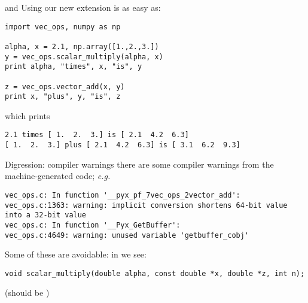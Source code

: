 \documentclass[10pt, t]{beamer}
\let\texttt=\graytt
\begin{document}
\begin{frame}[fragile,label=sec-4-6]{\texttt{cython} and \texttt{numpy}}
 Using our new extension is as easy as:
\lstset{language=Python,label= ,caption= ,numbers=none}
\begin{lstlisting}
import vec_ops, numpy as np

alpha, x = 2.1, np.array([1.,2.,3.])
y = vec_ops.scalar_multiply(alpha, x)
print alpha, "times", x, "is", y

z = vec_ops.vector_add(x, y)
print x, "plus", y, "is", z
\end{lstlisting}
\pause
which prints
\lstset{language=Python,label= ,caption= ,numbers=none}
\begin{lstlisting}
2.1 times [ 1.  2.  3.] is [ 2.1  4.2  6.3]
[ 1.  2.  3.] plus [ 2.1  4.2  6.3] is [ 3.1  6.2  9.3]
\end{lstlisting}
\end{frame}
\begin{frame}[fragile,label=sec-4-7]{Digression: compiler warnings}
 there are some compiler warnings from the machine-generated code; \emph{e.g.}
\lstset{language=sh,label= ,caption= ,numbers=none}
\begin{lstlisting}
vec_ops.c: In function '__pyx_pf_7vec_ops_2vector_add':
vec_ops.c:1363: warning: implicit conversion shortens 64-bit value into a 32-bit value
vec_ops.c: In function '__Pyx_GetBuffer':
vec_ops.c:4649: warning: unused variable 'getbuffer_cobj'
\end{lstlisting}
\pause
Some of these are avoidable: in  we see:
\lstset{language=C,label= ,caption= ,numbers=none}
\begin{lstlisting}
void scalar_multiply(double alpha, const double *x, double *z, int n);
\end{lstlisting}
\pause
(should be )
\end{frame}
\end{document}
